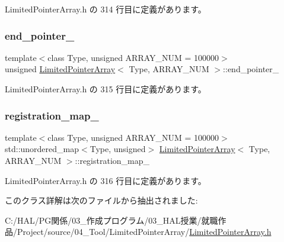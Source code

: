  Limited\+Pointer\+Array.\+h の 314 行目に定義があります。

\mbox{\label{class_limited_pointer_array_a7da38a8f2ea9a4b030f64f0e8adc27e8}} 
\subsubsection{\texorpdfstring{end\+\_\+pointer\+\_\+}{end\_pointer\_}}
{\footnotesize\ttfamily template$<$class Type, unsigned A\+R\+R\+A\+Y\+\_\+\+N\+UM = 100000$>$ \\
unsigned \mbox{\hyperlink{class_limited_pointer_array}{Limited\+Pointer\+Array}}$<$ Type, A\+R\+R\+A\+Y\+\_\+\+N\+UM $>$\+::end\+\_\+pointer\+\_\+\hspace{0.3cm}{\ttfamily [private]}}



 Limited\+Pointer\+Array.\+h の 315 行目に定義があります。

\mbox{\label{class_limited_pointer_array_a4f3ca120f5fc23ee3db798cb701d61a0}} 
\subsubsection{\texorpdfstring{registration\+\_\+map\+\_\+}{registration\_map\_}}
{\footnotesize\ttfamily template$<$class Type, unsigned A\+R\+R\+A\+Y\+\_\+\+N\+UM = 100000$>$ \\
std\+::unordered\+\_\+map$<$Type, unsigned$>$ \mbox{\hyperlink{class_limited_pointer_array}{Limited\+Pointer\+Array}}$<$ Type, A\+R\+R\+A\+Y\+\_\+\+N\+UM $>$\+::registration\+\_\+map\+\_\+\hspace{0.3cm}{\ttfamily [private]}}



 Limited\+Pointer\+Array.\+h の 316 行目に定義があります。



このクラス詳解は次のファイルから抽出されました\+:\begin{DoxyCompactItemize}
\item 
C\+:/\+H\+A\+L/\+P\+G関係/03\+\_\+作成プログラム/03\+\_\+\+H\+A\+L授業/就職作品/\+Project/source/04\+\_\+\+Tool/\+Limited\+Pointer\+Array/\mbox{\hyperlink{_limited_pointer_array_8h}{Limited\+Pointer\+Array.\+h}}\end{DoxyCompactItemize}
